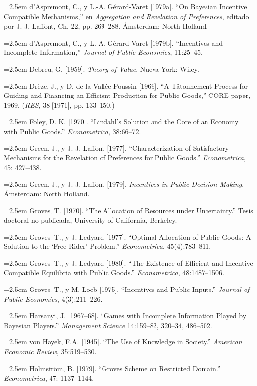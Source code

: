 \documentclass[12pt, letterpaper]{article}
\newcommand{\bibentry}[1]{\noindent\hangindent=2.5em\hangafter=1 \small #1 \par\vspace{0.75em}}
\begin{document}
\bibentry{d'Aspremont, C., y L.-A. Gérard-Varet [1979a]. ``On Bayesian Incentive Compatible Mechanisms,'' en \textit{Aggregation and Revelation of Preferences}, editado por J.-J. Laffont, Ch. 22, pp. 269--288. Ámsterdam: North Holland.}

\bibentry{d'Aspremont, C., y L.-A. Gérard-Varet [1979b]. ``Incentives and Incomplete Information,'' \textit{Journal of Public Economics}, 11:25--45.}

\bibentry{Debreu, G. [1959]. \textit{Theory of Value}. Nueva York: Wiley.}

\bibentry{Drèze, J., y D. de la Vallée Poussin [1969]. ``A Tâtonnement Process for Guiding and Financing an Efficient Production for Public Goods,'' CORE paper, 1969. (\textit{RES}, 38 [1971], pp. 133--150.)}

\bibentry{Foley, D. K. [1970]. ``Lindahl's Solution and the Core of an Economy with Public Goods.'' \textit{Econometrica}, 38:66--72.}

\bibentry{Green, J., y J.-J. Laffont [1977]. ``Characterization of Satisfactory Mechanisms for the Revelation of Preferences for Public Goods.'' \textit{Econometrica}, 45: 427--438.}

\bibentry{Green, J., y J.-J. Laffont [1979]. \textit{Incentives in Public Decision-Making}. Ámsterdam: North Holland.}

\bibentry{Groves, T. [1970]. ``The Allocation of Resources under Uncertainty.'' Tesis doctoral no publicada, University of California, Berkeley.}

\bibentry{Groves, T., y J. Ledyard [1977]. ``Optimal Allocation of Public Goods: A Solution to the `Free Rider' Problem.'' \textit{Econometrica}, 45(4):783--811.}

\bibentry{Groves, T., y J. Ledyard [1980]. ``The Existence of Efficient and Incentive Compatible Equilibria with Public Goods.'' \textit{Econometrica}, 48:1487--1506.}

\bibentry{Groves, T., y M. Loeb [1975]. ``Incentives and Public Inputs.'' \textit{Journal of Public Economies}, 4(3):211--226.}

\bibentry{Harsanyi, J. [1967--68]. ``Games with Incomplete Information Played by Bayesian Players.'' \textit{Management Science} 14:159--82, 320--34, 486--502.}

\bibentry{von Hayek, F.A. [1945]. ``The Use of Knowledge in Society.'' \textit{American Economic Review}, 35:519--530.}

\bibentry{Holmström, B. [1979]. ``Groves Scheme on Restricted Domain.'' \textit{Econometrica}, 47: 1137--1144.}
\end{document}
